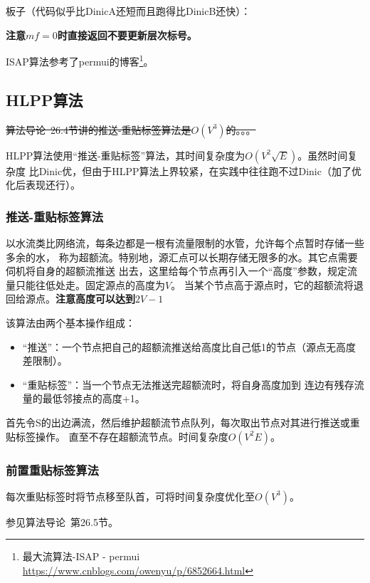 板子（代码似乎比DinicA还短而且跑得比DinicB还快）：


{\bfseries 注意$mf=0$时直接返回不要更新层次标号。}

ISAP算法参考了permui的博客\footnote{ 最大流算法-ISAP - permui
\url{https://www.cnblogs.com/owenyu/p/6852664.html}}。

\subsection{HLPP算法}

\sout{算法导论\cite{ITA3}~26.4节讲的推送-重贴标签算法是$O(V^3)$的。。。}

HLPP算法使用``推送-重贴标签''算法，其时间复杂度为$O(V^2\sqrt{E})$。虽然时间复杂度
比Dinic优，但由于HLPP算法上界较紧，在实践中往往跑不过Dinic（加了优化后表现还行）。

\subsubsection{推送-重贴标签算法}

以水流类比网络流，每条边都是一根有流量限制的水管，允许每个点暂时存储一些多余的水，
称为超额流。特别地，源汇点可以长期存储无限多的水。其它点需要伺机将自身的超额流推送
出去，这里给每个节点再引入一个``高度''参数，规定流量只能往低处走。固定源点的高度为$V$。
当某个节点高于源点时，它的超额流将退回给源点。{\bfseries 注意高度可以达到$2V-1$}

该算法由两个基本操作组成：
\begin{itemize}
	\item ``推送''：一个节点把自己的超额流推送给高度比自己低1的节点（源点无高度差限制）。
	\item ``重贴标签''：当一个节点无法推送完超额流时，将自身高度加到
	连边有残存流量的最低邻接点的高度+1。
\end{itemize}

首先令S的出边满流，然后维护超额流节点队列，每次取出节点对其进行推送或重贴标签操作。
直至不存在超额流节点。时间复杂度$O(V^2E)$。

\subsubsection{前置重贴标签算法}

每次重贴标签时将节点移至队首，可将时间复杂度优化至$O(V^3)$。

参见算法导论\cite{ITA3}~第26.5节。

